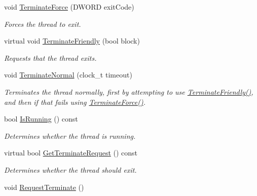 \begin{DoxyCompactItemize}
void \hyperlink{class_thread_single_a1efa47d61a11d4a582d6cfc18de2cd3c}{TerminateForce} (DWORD exitCode)
\begin{DoxyCompactList}\small\item\em Forces the thread to exit. \item\end{DoxyCompactList}\item 
virtual void \hyperlink{class_thread_single_a7b87608393cc1d6df1a6d331aecddcf3}{TerminateFriendly} (bool block)
\begin{DoxyCompactList}\small\item\em Requests that the thread exits. \item\end{DoxyCompactList}\item 
void \hyperlink{class_thread_single_a681da954e3187f48bd3fe78db32e9b7a}{TerminateNormal} (clock\_\-t timeout)
\begin{DoxyCompactList}\small\item\em Terminates the thread normally, first by attempting to use \hyperlink{class_thread_single_a7b87608393cc1d6df1a6d331aecddcf3}{TerminateFriendly()}, and then if that fails using \hyperlink{class_thread_single_a1efa47d61a11d4a582d6cfc18de2cd3c}{TerminateForce()}. \item\end{DoxyCompactList}\item 
bool \hyperlink{class_thread_single_a39fe6b29f7b9aec6a48b8ac917cfeacb}{IsRunning} () const 
\begin{DoxyCompactList}\small\item\em Determines whether the thread is running. \item\end{DoxyCompactList}\item 
virtual bool \hyperlink{class_thread_single_a8f5ea100a4e85739b2350e1318e8a6f3}{GetTerminateRequest} () const 
\begin{DoxyCompactList}\small\item\em Determines whether the thread should exit. \item\end{DoxyCompactList}\item 
\hypertarget{class_thread_single_a849f0d14914a6d7cac02d3cb7fa5b035}{
void \hyperlink{class_thread_single_a849f0d14914a6d7cac02d3cb7fa5b035}{RequestTerminate} ()}
\label{class_thread_single_a849f0d14914a6d7cac02d3cb7fa5b035}


\end{DoxyCompactItemize}
